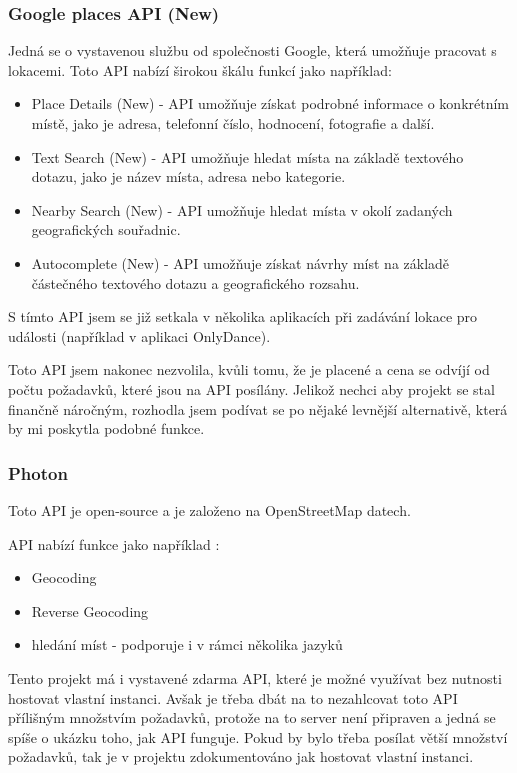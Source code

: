 \subsubsection{Google places API (New)}
Jedná se o vystavenou službu od společnosti Google, která umožňuje pracovat s lokacemi. Toto API nabízí širokou škálu funkcí \cite{google_places_api_overview} jako například: 
\begin{itemize}
    \item Place Details (New) - API umožňuje získat podrobné informace o konkrétním místě, jako je adresa, telefonní číslo, hodnocení, fotografie a další.
    \item Text Search (New) - API umožňuje hledat místa na základě textového dotazu, jako je název místa, adresa nebo kategorie.
    \item Nearby Search (New) - API umožňuje hledat místa v okolí zadaných geografických souřadnic.
    \item Autocomplete (New) - API umožňuje získat návrhy míst na základě částečného textového dotazu a geografického rozsahu.
\end{itemize} 
S tímto API jsem se již setkala v několika aplikacích při zadávání lokace pro události (například v aplikaci OnlyDance).

Toto API jsem nakonec nezvolila, kvůli tomu, že je placené a cena se odvíjí od počtu požadavků, které jsou na API posílány. Jelikož nechci aby projekt se stal finančně náročným, rozhodla jsem podívat se po nějaké levnější alternativě, která by mi poskytla podobné funkce.\cite{google_maps_places_pricing}

\subsubsection{Photon}
Toto API je open-source a je založeno na OpenStreetMap datech. \cite{komoot_photon}

API nabízí funkce jako například \cite{komoot_photon}:
\begin{itemize}
    \item Geocoding
    \item Reverse Geocoding
    \item hledání míst - podporuje i v rámci několika jazyků
\end{itemize}


Tento projekt má i vystavené zdarma API, které je možné využívat bez nutnosti hostovat vlastní instanci. Avšak je třeba dbát na to nezahlcovat toto API přílišným množstvím požadavků, protože na to server není připraven a jedná se spíše o ukázku toho, jak API funguje. Pokud by bylo třeba posílat větší množství požadavků, tak je v projektu zdokumentováno jak hostovat vlastní instanci. \cite{komoot_photon}

